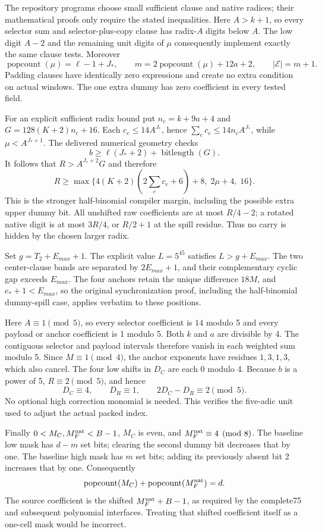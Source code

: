 The repository programs choose small sufficient clause and native
radices; their mathematical proofs only require the stated inequalities.
Here $A>k+1$, so every selector sum and selector-plus-copy clause has
radix-$A$ digits below $A$. The low digit $A-2$ and the remaining unit
digits of $\mu$ consequently implement exactly the same clause tests.
Moreover
\[
 \operatorname{popcount}(\mu)=\ell-1+J_*,\qquad
 m=2\operatorname{popcount}(\mu)+12a+2,
 \qquad |\mathcal E|=m+1.
\]
Padding clauses have identically zero expressions and create no extra
condition on actual windows. The one extra dummy has zero coefficient
in every tested field.

For an explicit sufficient radix bound put $n_c=k+9a+4$ and
$G=128(K+2)n_c+16$. Each $c_e\leq14A^{J_*}$, hence
$\sum_e c_e\leq14n_cA^{J_*}$, while $\mu<A^{J_*+1}$.
The delivered numerical geometry checks
\[
 b\geq\ell(J_*+2)+\operatorname{bitlength}(G).
\]
It follows that $R>A^{J_*+2}G$ and therefore
\[
 R\geq\max\{4(K+2)(2\sum_ec_e+6)+8,\;2\mu+4,\;16\}.
\]
This is the stronger half-binomial compiler margin, including the
possible extra upper dummy bit. All unshifted raw coefficients are at
most $R/4-2$; a rotated native digit is at most $3R/4$, or $R/2+1$ at
the spill residue. Thus no carry is hidden by the chosen larger radix.

Set $g=T_2+E_{max}+1$. The explicit value $L=5^{45}$ satisfies
$L>g+E_{max}$. The two center-clause bands are separated by
$2E_{max}+1$, and their complementary cyclic gap exceeds $E_{max}$.
The four anchors retain the unique difference $18M$, and
$e_*+1<E_{max}$, so the original synchronization proof, including the
half-binomial dummy-spill case, applies verbatim to these positions.

Here $A\equiv1\pmod5$, so every selector coefficient is $14$ modulo
5 and every payload or anchor coefficient is 1 modulo 5. Both $k$ and
$a$ are divisible by 4. The contiguous selector and payload intervals
therefore vanish in each weighted sum modulo 5. Since $M\equiv1\pmod4$,
the anchor exponents have residues $1,3,1,3$, which also cancel.
The four low shifts in $D_C$ are each 0 modulo 4. Because $b$ is a
power of 5, $R\equiv2\pmod5$, and hence
\[
      D_C\equiv4,\qquad D_R\equiv1,\qquad
      2D_C-D_R\equiv2\pmod5.
\]
No optional high correction monomial is needed. This verifies the
five-adic unit used to adjust the actual packed index.

Finally $0<M_C,M_F^{\rm nat}<B-1$, $M_C$ is even, and
$M_F^{\rm nat}\equiv4\pmod8$. The baseline low mask has $d-m$ set bits;
clearing the second dummy bit decreases that by one. The baseline high
mask has $m$ set bits; adding its previously absent bit 2 increases
that by one. Consequently
\[
       \operatorname{popcount}(M_C)+
       \operatorname{popcount}(M_F^{\rm nat})=d.
\]
The source coefficient is the shifted $M_F^{\rm nat}+B-1$, as required
by the complete75 and subsequent polynomial interfaces. Treating that
shifted coefficient itself as a one-cell mask would be incorrect.

